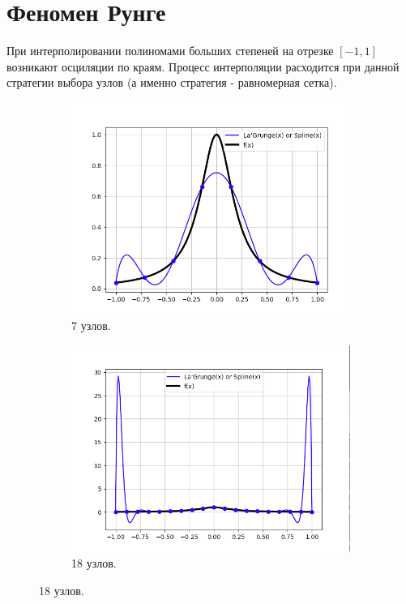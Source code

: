 \documentclass[12pt,a4paper]{article}
\begin{document}
\section{Феномен Рунге}

При интерполировании полиномами больших степеней на отрезке $[-1, 1]$ возникают осциляции по краям. Процесс интерполяции расходится при данной стратегии выбора узлов (а именно стратегия - равномерная сетка).

	\begin{figure}[h!]
		\centering
		\begin{subfigure}[b]{0.4\linewidth}
			\includegraphics[width=\linewidth]{runge1}
			\caption{7 узлов.}
		\end{subfigure}
		\begin{subfigure}[b]{0.4\linewidth}
			\includegraphics[width=\linewidth]{runge2}
			\caption{18 узлов.}
		\end{subfigure}
	\end{figure}
\end{document}

